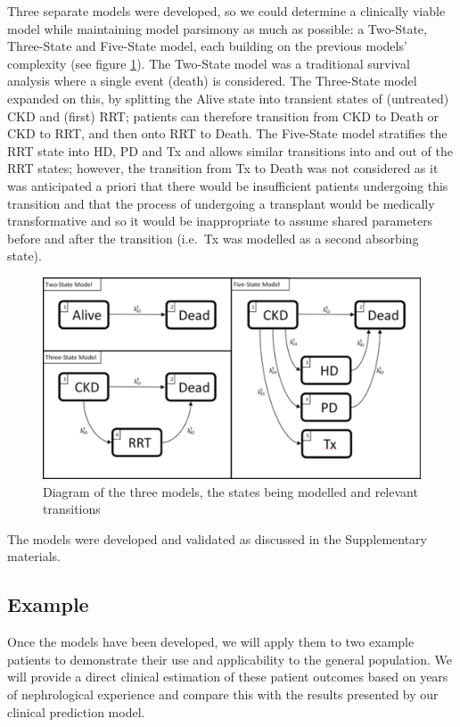\documentclass[
]{article}
\begin{document}
Three separate models were developed, so we could determine a clinically viable model while maintaining model parsimony as much as possible: a Two-State, Three-State and Five-State model, each building on the previous models' complexity (see figure \ref{fig:State-Diagram}). The Two-State model was a traditional survival analysis where a single event (death) is considered. The Three-State model expanded on this, by splitting the Alive state into transient states of (untreated) CKD and (first) RRT; patients can therefore transition from CKD to Death or CKD to RRT, and then onto RRT to Death. The Five-State model stratifies the RRT state into HD, PD and Tx and allows similar transitions into and out of the RRT states; however, the transition from Tx to Death was not considered as it was anticipated a priori that there would be insufficient patients undergoing this transition and that the process of undergoing a transplant would be medically transformative and so it would be inappropriate to assume shared parameters before and after the transition (i.e.~Tx was modelled as a second absorbing state).
\begin{figure}

{\centering \includegraphics[width=0.9\linewidth]{figure/Dev_Paper_State_Diagrams} 

}

\caption{Diagram of the three models, the states being modelled and relevant transitions}\label{fig:State-Diagram}
\end{figure}
The models were developed and validated as discussed in the Supplementary materials.

\hypertarget{example}{%
\subsection{Example}\label{example}}

Once the models have been developed, we will apply them to two example patients to demonstrate their use and applicability to the general population. We will provide a direct clinical estimation of these patient outcomes based on years of nephrological experience and compare this with the results presented by our clinical prediction model.
\end{document}

